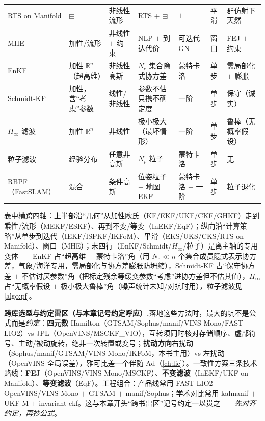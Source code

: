 \begin{table}[H]
\begin{tabularx}{\linewidth}{lLLLllL}
RTS on Manifold & $\boxminus$ & 非线性流形 & RTS $+$ $\boxplus$ & $1$ & 平滑 & 群仿射下天然 \\
MHE & 加性/流形 & 非线性 $+$ 约束 & NLP $+$ 到达代价 & 可迭代 GN & 窗口 & FEJ $+$ 约束 \\
EnKF & 加性 $\mathbb{R}^n$（超高维） & 非线性高斯 & $N_e$ 集合隐式协方差 & 蒙特卡洛 & 单步 & 需局部化 $+$ 膨胀 \\
Schmidt-KF & 加性，含“考虑”参数 & 线性/非线性 & 参数不估只携不确定度 & 一阶 & 单步 & 保守（诚实） \\
$H_\infty$ 滤波 & 加性 $\mathbb{R}^n$ & 非线性 & 极小极大（最坏情形） & 一阶 & 单步 & 鲁棒（无概率假设） \\
粒子滤波 & 经验分布 & 任意非高斯 & $N_p$ 粒子 & 蒙特卡洛 & 单步 & 无 \\
RBPF（FastSLAM） & 混合 & 条件高斯 & 位姿粒子 $+$ 地图 EKF & 蒙特卡洛 $+$ 一阶 & 单步 & 粒子退化 \\
\bottomrule
\end{tabularx}
\end{table}

\noindent 表中横跨四轴：上半部沿“几何”从加性欧氏（KF/EKF/UKF/CKF/GHKF）走到乘性/流形（MEKF/ESKF）、再到不变/等变（InEKF/EqF）；纵向沿“计算策略”从单步到迭代（IEKF/ISPKF/IKFoM）、平滑（EKS/UKS/CKS/RTS-on-Manifold）、窗口（MHE）；末四行（EnKF/Schmidt/$H_\infty$/粒子）是离主轴的专用变体——EnKF 占“超高维 $+$ 蒙特卡洛”角（用 $N_e\ll n$ 个集合成员隐式表示协方差，气象/海洋专用，需局部化与协方差膨胀防坍缩），Schmidt-KF 占“保守协方差 $+$ 不估讨厌参数”角（把标定残余等缓变参数“考虑”进协方差但不估其值），$H_\infty$ 占“无概率假设 $+$ 极小极大鲁棒”角（噪声统计未知/对抗时用），粒子滤波见 \cref{algo:pf}。

\begin{note}
\textbf{跨库选型与约定雷区（与本章记号约定呼应）.}\;落地这些方法时，最大的坑不是公式而是\emph{约定}\cite{sola2017quaternion}：\textbf{四元数} Hamilton（GTSAM/Sophus/manif/VINS-Mono/FAST-LIO2）vs JPL（OpenVINS/MSCKF\_VIO），互转须同时核对存储顺序、虚部符号、主动/被动旋转，绝非一次转置或变号；\textbf{扰动方向}右扰动（Sophus/manif/GTSAM/VINS-Mono/IKFoM，本书主用）vs 左扰动（OpenVINS 全局误差），雅可比差一个伴随 $\mathrm{Ad}$（\cref{ch:lie}）。一致性方案三条技术路线：\textbf{FEJ}（OpenVINS/VINS-Mono/MSCKF）、\textbf{不变滤波}（InEKF/UKF-on-Manifold）、\textbf{等变滤波}（EqF）。工程组合：产品线常用 FAST-LIO2 $+$ OpenVINS/VINS-Mono $+$ GTSAM $+$ manif/Sophus；学术对比常用 kalmanif $+$ UKF-M $+$ invariant-ekf。这与本章开头“跨书雷区”记号约定一以贯之——\emph{先对齐约定，再抄公式}。
\end{note}

